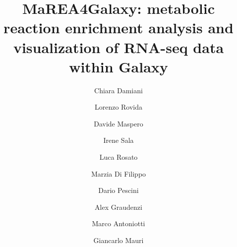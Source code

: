 \documentclass[preprint,12pt,authoryear]{elsarticle}
\newcommand{\mareagalaxy}{\textsf{MaREA4Galaxy}}
\begin{document}
\begin{frontmatter}


  
  
  
\title{\textsf{MaREA4Galaxy}: metabolic reaction enrichment analysis
  and visualization of RNA-seq data within Galaxy}


  \author[label3,label1,label2]{Chiara Damiani}
  \author[label1]{Lorenzo Rovida}
  \author[label1,label4]{Davide Maspero}
  \author[label1]{Irene Sala}
  \author[label1]{Luca Rosato}
  \author[label1]{Marzia Di Filippo}
  \author[label6,label2]{Dario Pescini}
  \author[label5]{Alex Graudenzi}
  \author[label1]{Marco Antoniotti}
  \author[label1,label2]{Giancarlo Mauri}

  \address[label3]{Dept. of Biotechnology and Biosciences,\\
    Universit\'{a} degli Studi di Milano-Bicocca, Milan, Italy}
  
  \address[label1]{Dept. of Informatics, Systems and Communication,\\
    Universit\'{a} degli Studi di Milano-Bicocca, Milan, Italy}
  
  \address[label2]{SYSBIO Centre of Systems Biology,\\
    Universit\'{a} degli Studi di Milano-Bicocca, Milan, Italy}

  \address[label4]{Fondazione IRCCS Istituto Nazionale dei Tumori,
    Milan, Italy}
  \address[label5]{Institute of Molecular Bioimaging and Physiology of
    the Italian National Research Council (IBFM-CNR), Segrate, Milan,
    Italy}
  \address[label6]{Department of Statistics and Quantitative Methods,\\
    Universit\'{a} degli Studi di Milano-Bicocca, Milan, Italy}


\end{frontmatter}
\end{document}
